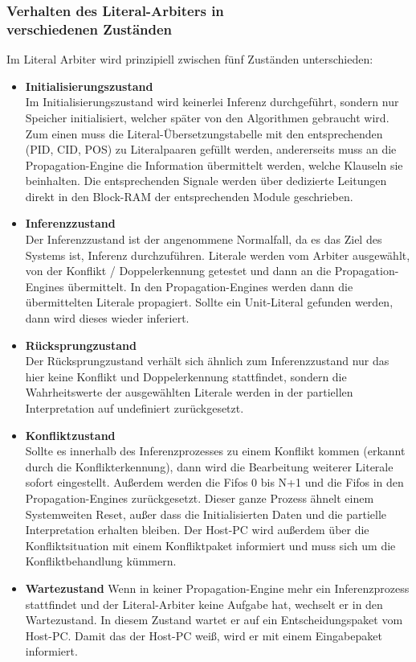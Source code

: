 \subsubsection{Verhalten des Literal-Arbiters in \\ verschiedenen Zuständen}
Im Literal Arbiter wird prinzipiell zwischen fünf Zuständen unterschieden:
\begin{itemize}
\item
  \textbf{Initialisierungszustand}\\
  Im Initialisierungszustand wird keinerlei Inferenz durchgeführt, sondern nur Speicher initialisiert,
  welcher später von den Algorithmen gebraucht wird. Zum einen muss die Literal-Übersetzungstabelle 
  mit den entsprechenden (PID, CID, POS) zu Literalpaaren gefüllt werden, andererseits muss an die
  Propagation-Engine die Information übermittelt werden, welche Klauseln sie beinhalten. Die
  entsprechenden Signale werden über dedizierte Leitungen direkt in den Block-RAM
  der entsprechenden Module geschrieben.
\item
  \textbf{Inferenzzustand}\\
  Der Inferenzzustand ist der angenommene Normalfall, da es das Ziel
  des Systems ist, Inferenz durchzuführen. Literale werden vom Arbiter ausgewählt,
  von der Konflikt / Doppelerkennung getestet und dann an die Propagation-Engines übermittelt.
  In den Propagation-Engines werden dann die übermittelten Literale propagiert.
  Sollte ein Unit-Literal gefunden werden, dann wird dieses wieder inferiert.
\item
  \textbf{Rücksprungzustand}\\
  Der Rücksprungzustand verhält sich ähnlich zum Inferenzzustand nur das hier keine Konflikt und
  Doppelerkennung stattfindet, sondern die Wahrheitswerte der ausgewählten Literale werden in 
  der partiellen Interpretation auf undefiniert zurückgesetzt.
\item
  \textbf{Konfliktzustand}\\
  Sollte es innerhalb des Inferenzprozesses zu einem Konflikt kommen (erkannt durch
  die Konflikterkennung), dann wird die Bearbeitung weiterer Literale sofort eingestellt.
  Außerdem werden die Fifos 0 bis N+1 und die Fifos in den Propagation-Engines zurückgesetzt.
  Dieser ganze Prozess ähnelt einem Systemweiten Reset,  außer dass die Initialisierten
  Daten und die partielle Interpretation erhalten bleiben. Der Host-PC wird außerdem
  über die Konfliktsituation mit einem Konfliktpaket informiert und muss sich
  um die Konfliktbehandlung kümmern.
\item
  \textbf{Wartezustand}
  Wenn in keiner Propagation-Engine mehr ein Inferenzprozess stattfindet
  und der Literal-Arbiter keine Aufgabe hat, wechselt er in den Wartezustand.
  In diesem Zustand wartet er auf ein Entscheidungspaket vom Host-PC.
  Damit das der Host-PC weiß, wird er mit einem Eingabepaket informiert.
  
\end{itemize}

